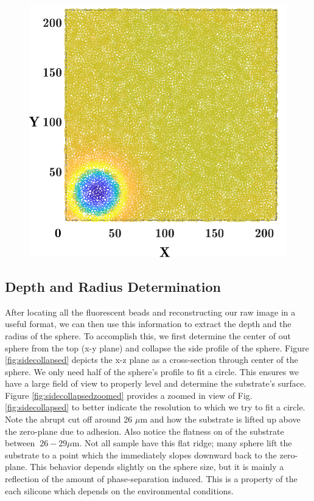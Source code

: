 \begin{figure}[h]
	\centering
	\includegraphics[width=\linewidth]{Chapters/Figures/sphere011_ia/particle_located_top_view}
	\caption[Particle Located: Top View]{}
	\label{fig:particlelocatedtopview}
\end{figure}
\subsection{Depth and Radius Determination}
After locating all the fluorescent beads and reconstructing our raw image in a useful format, we can then use this information to extract the depth and the radius of the sphere. To accomplish this, we first determine the center of out sphere from the top (x-y plane) and collapse the side profile of the  sphere. Figure \ref{fig:sidecollapsed} depicts the x-z plane as a cross-section through center of the sphere. We only need half of the sphere's profile to fit a circle. This ensures we have a large field of view to properly level and determine the substrate's surface. Figure \ref{fig:sidecollapsedzoomed} provides a zoomed in view of Fig. \ref{fig:sidecollapsed} to better indicate the resolution to which we try to fit a circle. Note the abrupt cut off around 26 $\mu$m and how the substrate is lifted up above the zero-plane due to adhesion. Also notice the flatness on of the substrate between $ ~26-29 \mu $m. Not all sample have this flat ridge; many sphere lift the substrate to a point which the immediately slopes downward back to the zero-plane. This behavior depends slightly on the sphere size, but it is mainly a reflection of the amount of phase-separation induced. This is a property of the each silicone which depends on the environmental conditions.


